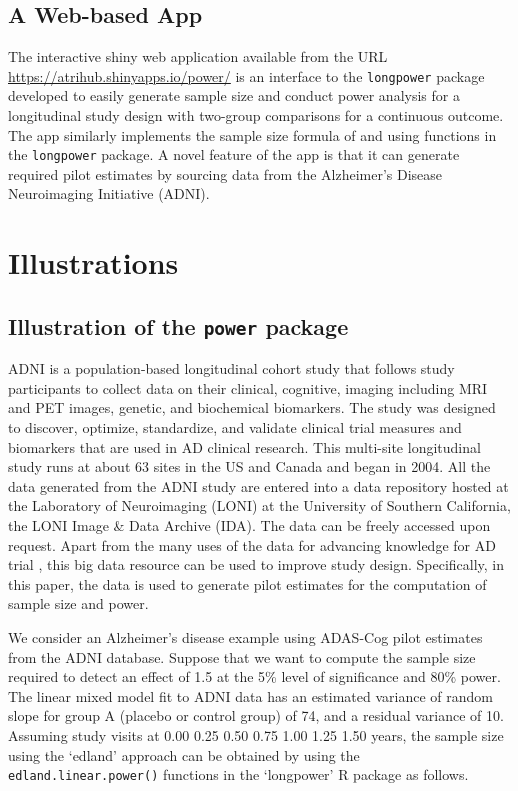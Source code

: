 \subsection{A Web-based App}
\label{model4}
The interactive shiny \citep{RShiny(2021)} web application available from the URL \url{https://atrihub.shinyapps.io/power/} is an interface to the \texttt{longpower} package developed to easily generate sample size and conduct power analysis for a longitudinal study design with two-group comparisons for a continuous outcome. The app similarly implements the sample size formula of \cite{Liu_Liang(1997)} and \cite{Diggle_Liang_Zeger(1994),Diggle_etal(2002)} using functions in the \texttt{longpower} package. A novel feature of the app is that  it can generate required pilot estimates by sourcing data from the Alzheimer's Disease Neuroimaging Initiative (ADNI).

\section{Illustrations}
\label{sec3}
\subsection{Illustration of the \texttt{power} package}
ADNI is a population-based longitudinal cohort study that follows study participants to collect data on their clinical, cognitive, imaging including MRI and PET images, genetic, and biochemical biomarkers. The study was designed to discover, optimize, standardize, and validate clinical trial measures and biomarkers that are used in AD clinical research. This multi-site longitudinal study runs at about 63 sites in the US and Canada and began in 2004. All the data generated from the ADNI study are entered into a data repository hosted at the Laboratory of Neuroimaging (LONI) at the University of Southern California, the LONI Image \& Data Archive (IDA). The data can be freely accessed upon request. Apart from the many uses of the data for advancing knowledge for AD trial \citep{Weiner_etal(2015)}, this big data resource can be used to improve study design. Specifically, in this paper, the data is used to generate pilot estimates for the computation of sample size and power.

We consider an Alzheimer's disease example using ADAS-Cog \citep{rosen1984alzheimer} pilot estimates from the ADNI database. Suppose that we want to compute the sample size required to detect an effect of 1.5 at the 5\% level of significance and 80\% power. The linear mixed model fit to ADNI data has an estimated variance of random slope for group A (placebo or control group) of 74, and a residual variance of 10. Assuming study visits at 0.00 0.25 0.50 0.75 1.00 1.25 1.50 years, the sample size using the `edland' approach can be obtained by using the \texttt{edland.linear.power()} functions in the `longpower' R package as follows. 

